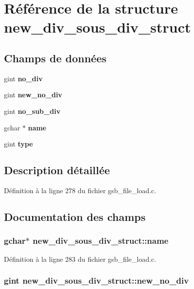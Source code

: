 \section{Référence de la structure new\_\-div\_\-sous\_\-div\_\-struct}
\label{structnew__div__sous__div__struct}
\subsection*{Champs de données}
\begin{DoxyCompactItemize}
\item 
gint {\bf no\_\-div}
\item 
gint {\bf new\_\-no\_\-div}
\item 
gint {\bf no\_\-sub\_\-div}
\item 
gchar $\ast$ {\bf name}
\item 
gint {\bf type}
\end{DoxyCompactItemize}


\subsection{Description détaillée}


Définition à la ligne 278 du fichier gsb\_\-file\_\-load.c.



\subsection{Documentation des champs}
\subsubsection[{name}]{\setlength{\rightskip}{0pt plus 5cm}gchar$\ast$ {\bf new\_\-div\_\-sous\_\-div\_\-struct::name}}\label{structnew__div__sous__div__struct_abf53e557c6d6b61d14070ee02c2b0a0e}


Définition à la ligne 283 du fichier gsb\_\-file\_\-load.c.

\subsubsection[{new\_\-no\_\-div}]{\setlength{\rightskip}{0pt plus 5cm}gint {\bf new\_\-div\_\-sous\_\-div\_\-struct::new\_\-no\_\-div}}\label{structnew__div__sous__div__struct_a8ba4e222aa37fe9333d648f85e4c40be}


